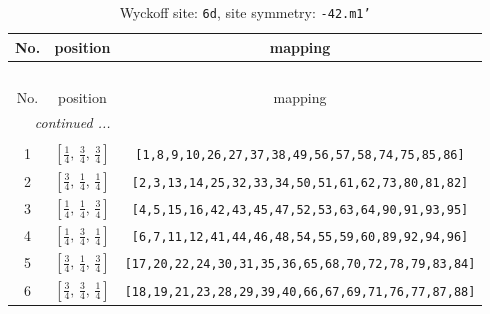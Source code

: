 \documentclass[fleqn,8pt]{jsarticle}
\begin{document}
\renewcommand{\arraystretch}{1.2}
\begin{longtable}{ccc}
\caption{Wyckoff site: {\tt 6d}, site symmetry: {\tt -42.m1'}}
 \\
 \hline \hline
No. & position & mapping \\ \hline \endfirsthead

\multicolumn{2}{l}{\tablename\ \thetable{}} \\
 \hline \hline
No. & position & mapping \\ \hline \endhead

 \hline \hline
\multicolumn{2}{r}{\footnotesize\it continued ...} \\ \endfoot

 \hline \hline
\multicolumn{2}{r}{} \\ \endlastfoot

1 & $\left[ \frac{1}{4},\, \frac{3}{4},\, \frac{3}{4} \right]$ & {\tt [1,8,9,10,26,27,37,38,49,56,57,58,74,75,85,86]} \\ \hline
2 & $\left[ \frac{3}{4},\, \frac{1}{4},\, \frac{1}{4} \right]$ & {\tt [2,3,13,14,25,32,33,34,50,51,61,62,73,80,81,82]} \\ \hline
3 & $\left[ \frac{1}{4},\, \frac{1}{4},\, \frac{3}{4} \right]$ & {\tt [4,5,15,16,42,43,45,47,52,53,63,64,90,91,93,95]} \\ \hline
4 & $\left[ \frac{1}{4},\, \frac{3}{4},\, \frac{1}{4} \right]$ & {\tt [6,7,11,12,41,44,46,48,54,55,59,60,89,92,94,96]} \\ \hline
5 & $\left[ \frac{3}{4},\, \frac{1}{4},\, \frac{3}{4} \right]$ & {\tt [17,20,22,24,30,31,35,36,65,68,70,72,78,79,83,84]} \\ \hline
6 & $\left[ \frac{3}{4},\, \frac{3}{4},\, \frac{1}{4} \right]$ & {\tt [18,19,21,23,28,29,39,40,66,67,69,71,76,77,87,88]} \\
\end{longtable}
\renewcommand{\arraystretch}{1.2}
\end{document}
